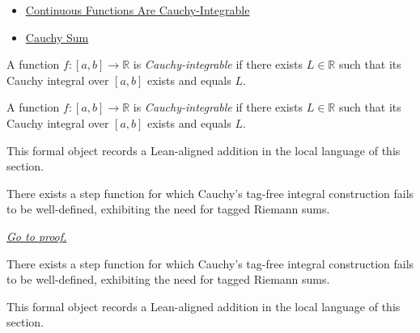 \begin{dependencies}
\begin{itemize}
  \item \hyperref[thm:continuous-cauchy-integrable]{Continuous Functions Are Cauchy-Integrable}
  \item \hyperref[def:cauchy-sum]{Cauchy Sum}
\end{itemize}
\end{dependencies}

\begin{definition}
\label{def:is-cauchy-integrable}
A function $f:[a,b]\to\mathbb R$ is \emph{Cauchy-integrable} if there exists $L\in\mathbb R$ such that its Cauchy integral over $[a,b]$ exists and equals $L$.
\end{definition}

\begin{remark*}
A function $f:[a,b]\to\mathbb R$ is \emph{Cauchy-integrable} if there exists $L\in\mathbb R$ such that its Cauchy integral over $[a,b]$ exists and equals $L$.
\end{remark*}

\begin{remark*}[Interpretation]
This formal object records a Lean-aligned addition in the local language of this section.
\end{remark*}

\begin{dependencies}
\NoLocalDependencies
\end{dependencies}
\begin{theorem}
\label{thm:cauchy-step-function-failure-witness}
There exists a step function for which Cauchy's tag-free integral construction fails to be well-defined, exhibiting the need for tagged Riemann sums.

\smallskip
\noindent
\hyperref[prf:cauchy-step-function-failure-witness]{\textit{Go to proof.}}
\end{theorem}

\begin{remark*}
There exists a step function for which Cauchy's tag-free integral construction fails to be well-defined, exhibiting the need for tagged Riemann sums.
\end{remark*}

\begin{remark*}[Interpretation]
This formal object records a Lean-aligned addition in the local language of this section.
\end{remark*}

\begin{dependencies}
\NoLocalDependencies
\end{dependencies}
